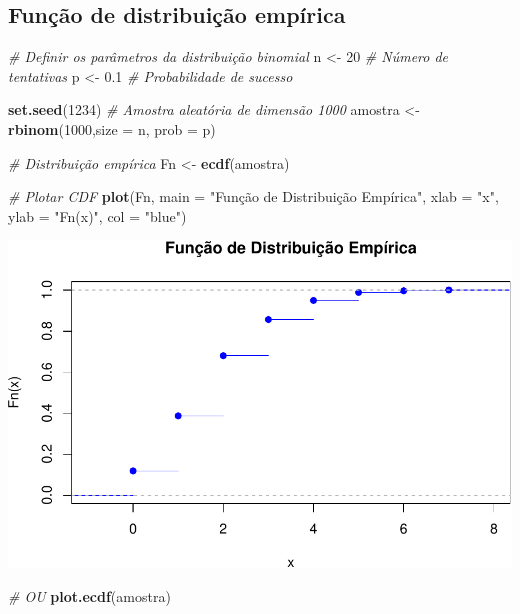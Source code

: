 \documentclass[
]{book}
\newenvironment{Shaded}{\begin{snugshade}}{\end{snugshade}}
\newcommand{\AttributeTok}[1]{\textcolor[rgb]{0.13,0.29,0.53}{#1}}
\newcommand{\CommentTok}[1]{\textcolor[rgb]{0.56,0.35,0.01}{\textit{#1}}}
\newcommand{\DecValTok}[1]{\textcolor[rgb]{0.00,0.00,0.81}{#1}}
\newcommand{\FloatTok}[1]{\textcolor[rgb]{0.00,0.00,0.81}{#1}}
\newcommand{\FunctionTok}[1]{\textcolor[rgb]{0.13,0.29,0.53}{\textbf{#1}}}
\newcommand{\NormalTok}[1]{#1}
\newcommand{\OtherTok}[1]{\textcolor[rgb]{0.56,0.35,0.01}{#1}}
\newcommand{\StringTok}[1]{\textcolor[rgb]{0.31,0.60,0.02}{#1}}
\begin{document}
\subsection{Função de distribuição empírica}\label{funuxe7uxe3o-de-distribuiuxe7uxe3o-empuxedrica-1}

\begin{Shaded}
\begin{Highlighting}[]
\CommentTok{\# Definir os parâmetros da distribuição binomial}
\NormalTok{n }\OtherTok{\textless{}{-}} \DecValTok{20} \CommentTok{\# Número de tentativas}
\NormalTok{p }\OtherTok{\textless{}{-}} \FloatTok{0.1} \CommentTok{\# Probabilidade de sucesso}

\FunctionTok{set.seed}\NormalTok{(}\DecValTok{1234}\NormalTok{)}
\CommentTok{\# Amostra aleatória de dimensão 1000}
\NormalTok{amostra }\OtherTok{\textless{}{-}} \FunctionTok{rbinom}\NormalTok{(}\DecValTok{1000}\NormalTok{,}\AttributeTok{size =}\NormalTok{ n, }\AttributeTok{prob =}\NormalTok{ p)}

\CommentTok{\# Distribuição empírica }
\NormalTok{Fn }\OtherTok{\textless{}{-}} \FunctionTok{ecdf}\NormalTok{(amostra)}

\CommentTok{\# Plotar CDF}
\FunctionTok{plot}\NormalTok{(Fn, }\AttributeTok{main =} \StringTok{"Função de Distribuição Empírica"}\NormalTok{, }\AttributeTok{xlab =} \StringTok{"x"}\NormalTok{, }
\AttributeTok{ylab =} \StringTok{"Fn(x)"}\NormalTok{, }\AttributeTok{col =} \StringTok{"blue"}\NormalTok{)}
\end{Highlighting}
\end{Shaded}

\includegraphics{introR_files/figure-latex/unnamed-chunk-259-1.pdf}

\begin{Shaded}
\begin{Highlighting}[]
\CommentTok{\# OU}
\FunctionTok{plot.ecdf}\NormalTok{(amostra)}
\end{Highlighting}
\end{Shaded}
\end{document}
